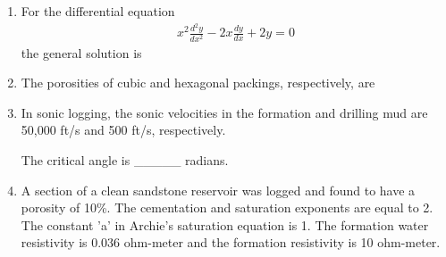 \documentclass[journal]{IEEEtran}
\begin{document}
\begin{enumerate}
    \hfill{}
    
    \item For the differential equation  
    \begin{align}
    x^2 \frac{d^2 y}{dx^2} - 2x \frac{dy}{dx} + 2y = 0 
    \end{align}  
    the general solution is  
    
    \begin{enumerate}  \end{enumerate}              
    
    \hfill{}
    
    \item The porosities of cubic and hexagonal packings, respectively, are  
    
    \begin{enumerate}  \end{enumerate}              
    
    \hfill{}
    
    \item In sonic logging, the sonic velocities in the formation and drilling mud are 50,000 ft/s and 500 ft/s, respectively.  
    
    The critical angle is \_\_\_\_\_ radians.  
    
    \hfill{}
    
    \item A section of a clean sandstone reservoir was logged and found to have a porosity of 10\%. The cementation  and saturation  exponents are equal to 2. The constant 'a' in Archie's saturation equation is 1. The formation water resistivity is 0.036 ohm-meter and the formation resistivity is 10 ohm-meter.  
    

\end{enumerate}
\end{document}
